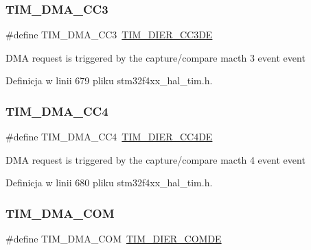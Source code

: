 \subsubsection{\texorpdfstring{T\+I\+M\+\_\+\+D\+M\+A\+\_\+\+C\+C3}{TIM\_DMA\_CC3}}
{\footnotesize\ttfamily \#define T\+I\+M\+\_\+\+D\+M\+A\+\_\+\+C\+C3~\hyperlink{group___peripheral___registers___bits___definition_ga1567bff5dc0564b26a8b3cff1f0fe0a4}{T\+I\+M\+\_\+\+D\+I\+E\+R\+\_\+\+C\+C3\+DE}}

D\+MA request is triggered by the capture/compare macth 3 event event 

Definicja w linii 679 pliku stm32f4xx\+\_\+hal\+\_\+tim.\+h.

\mbox{\label{group___t_i_m___d_m_a__sources_ga59495cf79894dfe5e5b2029863aed956}} 
\subsubsection{\texorpdfstring{T\+I\+M\+\_\+\+D\+M\+A\+\_\+\+C\+C4}{TIM\_DMA\_CC4}}
{\footnotesize\ttfamily \#define T\+I\+M\+\_\+\+D\+M\+A\+\_\+\+C\+C4~\hyperlink{group___peripheral___registers___bits___definition_gaaba034412c54fa07024e516492748614}{T\+I\+M\+\_\+\+D\+I\+E\+R\+\_\+\+C\+C4\+DE}}

D\+MA request is triggered by the capture/compare macth 4 event event 

Definicja w linii 680 pliku stm32f4xx\+\_\+hal\+\_\+tim.\+h.

\mbox{\label{group___t_i_m___d_m_a__sources_gac5f4c56e944bda8ba0c23b97275020ba}} 
\subsubsection{\texorpdfstring{T\+I\+M\+\_\+\+D\+M\+A\+\_\+\+C\+OM}{TIM\_DMA\_COM}}
{\footnotesize\ttfamily \#define T\+I\+M\+\_\+\+D\+M\+A\+\_\+\+C\+OM~\hyperlink{group___peripheral___registers___bits___definition_ga79c3fab9d33de953a0a7f7d6516c73bc}{T\+I\+M\+\_\+\+D\+I\+E\+R\+\_\+\+C\+O\+M\+DE}}

